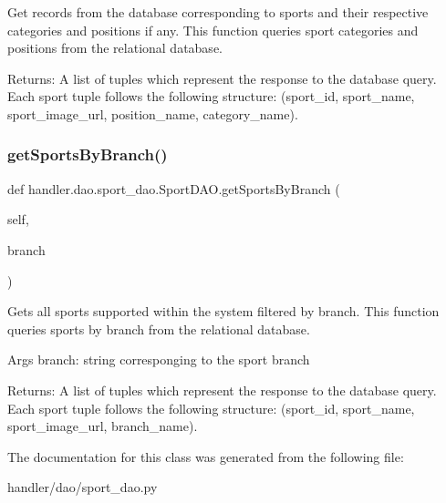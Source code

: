 \begin{DoxyVerb}Get records from the database corresponding to sports and their 
respective categories and positions if any.
This function queries sport categories and positions from the relational database.

Returns:
    A list of tuples which represent the response to the database query.
    Each sport tuple follows the following structure:
(sport_id, sport_name, sport_image_url, position_name, category_name).
\end{DoxyVerb}
 \mbox{\label{classhandler_1_1dao_1_1sport__dao_1_1_sport_d_a_o_a4035819643d6056291007c663cb4a3a2}} 
\subsubsection{\texorpdfstring{get\+Sports\+By\+Branch()}{getSportsByBranch()}}
{\footnotesize\ttfamily def handler.\+dao.\+sport\+\_\+dao.\+Sport\+D\+A\+O.\+get\+Sports\+By\+Branch (\begin{DoxyParamCaption}\item[{}]{self,  }\item[{}]{branch }\end{DoxyParamCaption})}

\begin{DoxyVerb}Gets all sports supported within the system filtered by branch.
This function queries sports by branch from the relational database.

Args
    branch: string corresponging to the sport branch

Returns:
    A list of tuples which represent the response to the database query.
    Each sport tuple follows the following structure:
(sport_id, sport_name, sport_image_url, branch_name).
\end{DoxyVerb}
 

The documentation for this class was generated from the following file\+:\begin{DoxyCompactItemize}
\item 
handler/dao/sport\+\_\+dao.\+py\end{DoxyCompactItemize}
